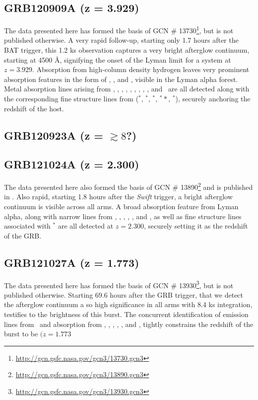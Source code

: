 \documentclass{aa}    %
\begin{document}
\subsection{GRB120909A (z = 3.929)}
The data presented here has formed the basis of GCN \#
13730\footnote{\url{http://gcn.gsfc.nasa.gov/gcn3/13730.gcn3}}, but is not
published otherwise. A very rapid follow-up, starting only 1.7 hours after the
BAT trigger, this 1.2 ks observation captures a very bright afterglow
continuum, starting at 4500 \AA, signifying the onset of the Lyman limit for a 
system at $z = 3.929$. Absorption from high-column density hydrogen leaves very
prominent absorption features in the form of \lya, \lyb, and \lyg, visible in
the Lyman alpha forest. Metal absorption lines arising from \feii, \NIii,
\SIii, \sii, \alii, \aliii, \cii, \oi, \civ, and \znii~are all detected along
with the corresponding fine structure lines from (\feii$^*$, \SIii$^*$,
\oi$^*$, \oi$^**$, \cii$^*$), securely anchoring the redshift of the host.




\subsection{GRB120923A (z = $\gtrsim8$?)}






\subsection{GRB121024A (z = 2.300)}
The data presented here also formed the basis of GCN \#
13890\footnote{\url{http://gcn.gsfc.nasa.gov/gcn3/13890.gcn3}} and is published
in \citet{Friis2015}. Also rapid, starting 1.8 hours after the \textit{Swift}
trigger, a bright afterglow continuum is visible across all arms. A broad
absorption feature from Lyman alpha, along with narrow lines from \civ, \SIii,
\SIiv, \feii, \sii, and \alii, as well as fine structure lines associated with
\SIii$^*$ are all detected at $z = 2.300$, securely setting it as the redshift
of the GRB.

\subsection{GRB121027A (z = 1.773)}		
The data presented here has formed the basis of GCN \#
13930\footnote{\url{http://gcn.gsfc.nasa.gov/gcn3/13930.gcn3}}, but is not
published otherwise. Starting 69.6 hours after the GRB trigger, that we detect
the afterglow continuum a so high significance in all arms with 8.4 ks
integration, testifies to the brightness of this burst. The concurrent
identification of emission lines from \oiii~and absorption from \civ, \alii,
\aliii, \mgi, \mgii, and \feii, tightly constrains the redshift of the burst to
be $(z = 1.773$
\end{document}
